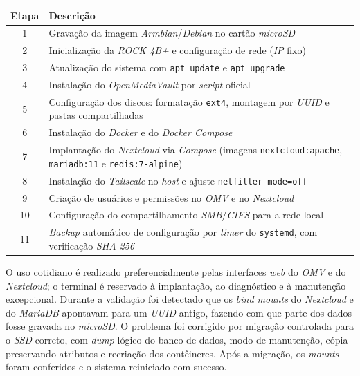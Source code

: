 \begin{quadro}[H]
    \centering
    \small
    \begin{tabularx}{\linewidth}{|c|>{\raggedright\arraybackslash}X|}
        \hline
        \textbf{Etapa} & \textbf{Descrição} \\
        \hline
        \hline
        1 & Gravação da imagem \textit{Armbian}/\textit{Debian} no cartão \textit{microSD} \\
        \hline
        2 & Inicialização da \textit{ROCK 4B+} e configuração de rede (\textit{IP} fixo) \\
        \hline
        3 & Atualização do sistema com \texttt{apt update} e \texttt{apt upgrade} \\
        \hline
        4 & Instalação do \textit{OpenMediaVault} por \textit{script} oficial \\
        \hline
        5 & Configuração dos discos: formatação \texttt{ext4}, montagem por \textit{UUID} e pastas compartilhadas \\
        \hline
        6 & Instalação do \textit{Docker} e do \textit{Docker Compose} \\
        \hline
        7 & Implantação do \textit{Nextcloud} via \textit{Compose} (imagens \texttt{nextcloud:apache}, \texttt{mariadb:11} e \texttt{redis:7-alpine}) \\
        \hline
        8 & Instalação do \textit{Tailscale} no \textit{host} e ajuste \texttt{netfilter-mode=off} \\
        \hline
        9 & Criação de usuários e permissões no \textit{OMV} e no \textit{Nextcloud} \\
        \hline
        10 & Configuração do compartilhamento \textit{SMB}/\textit{CIFS} para a rede local \\
        \hline
        11 & \textit{Backup} automático de configuração por \textit{timer} do \texttt{systemd}, com verificação \textit{SHA-256} \\
        \hline
    \end{tabularx}
    \vspace{0.2cm}
    \fonteautoria
\end{quadro}

O uso cotidiano é realizado preferencialmente pelas interfaces \textit{web} do \textit{OMV} e do \textit{Nextcloud}; o terminal é reservado à implantação, ao diagnóstico e à manutenção excepcional. Durante a validação foi detectado que os \textit{bind mounts} do \textit{Nextcloud} e do \textit{MariaDB} apontavam para um \textit{UUID} antigo, fazendo com que parte dos dados fosse gravada no \textit{microSD}. O problema foi corrigido por migração controlada para o \textit{SSD} correto, com \textit{dump} lógico do banco de dados, modo de manutenção, cópia preservando atributos e recriação dos contêineres. Após a migração, os \textit{mounts} foram conferidos e o sistema reiniciado com sucesso.

